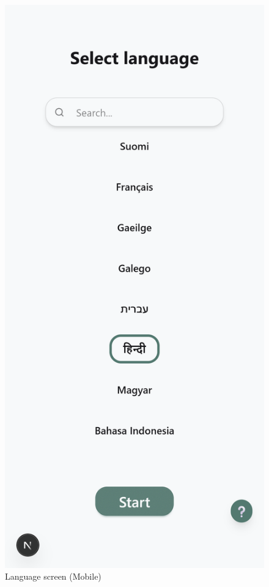 \begin{figure}[H]
    \centering
    \includegraphics[height=0.3\textheight,keepaspectratio]{images/1_language_mobile.png}
    \caption{Language screen (Mobile)}
\end{figure}

